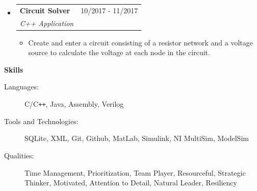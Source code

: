 \documentclass[letterpaper,11pt]{article}
\makeatletter
\newcommand{\resitem}[1]{\item #1 \vspace{-2pt}}
\newcommand{\resheading}[1]{{\large \colorbox{mygrey}{\begin{minipage}{\textwidth}{\textbf{#1 \vphantom{p\^{E}}}}\end{minipage}}}}
\newcommand{\ressubheading}[4]{
\begin{tabular*}{7.0in}{l@{\extracolsep{\fill}}r}
		\textbf{#1} & #2 \\
		\textit{#3} & \textit{#4} \\
\end{tabular*}\vspace{-6pt}}
\makeatother
\begin{document}
\begin{itemize}
  	\item
      \ressubheading{Circuit Solver}{10/2017 -   11/2017}{C++ Application}{}
      \begin{itemize}
          \resitem{Create and enter a circuit consisting of a resistor network and a voltage source to calculate the voltage at each node in the circuit.}
      \end{itemize}
    

\end{itemize}


\resheading{Skills}

\begin{description}
\item[Languages:]
C/C{}\verb!++!, Java, Assembly, Verilog
\item[Tools and Technologies:]
SQLite, XML, Git, Github, MatLab, Simulink, NI MultiSim, ModelSim
\item[Qualities:]
Time Management, Prioritization, Team Player, Resourceful, Strategic Thinker, Motivated, Attention to Detail, Natural Leader, Resiliency
\end{description}


\pagebreak
\end{document}
